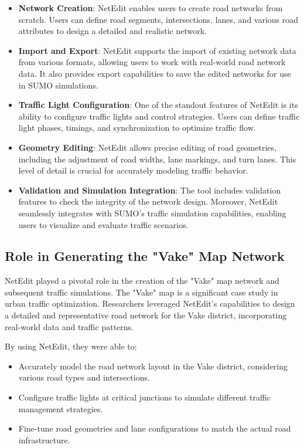 \begin{itemize}
    \item \textbf{Network Creation}: NetEdit enables users to create road networks from scratch. Users can define road segments, intersections, lanes, and various road attributes to design a detailed and realistic network.
    
    \item \textbf{Import and Export}: NetEdit supports the import of existing network data from various formats, allowing users to work with real-world road network data. It also provides export capabilities to save the edited networks for use in SUMO simulations.
    
    \item \textbf{Traffic Light Configuration}: One of the standout features of NetEdit is its ability to configure traffic lights and control strategies. Users can define traffic light phases, timings, and synchronization to optimize traffic flow.
    
    \item \textbf{Geometry Editing}: NetEdit allows precise editing of road geometries, including the adjustment of road widths, lane markings, and turn lanes. This level of detail is crucial for accurately modeling traffic behavior.
    
    \item \textbf{Validation and Simulation Integration}: The tool includes validation features to check the integrity of the network design. Moreover, NetEdit seamlessly integrates with SUMO's traffic simulation capabilities, enabling users to visualize and evaluate traffic scenarios.
\end{itemize}

\subsection{Role in Generating the "Vake" Map Network}

NetEdit played a pivotal role in the creation of the "Vake" map network and subsequent traffic simulations. The "Vake" map is a significant case study in urban traffic optimization. Researchers leveraged NetEdit's capabilities to design a detailed and representative road network for the Vake district, incorporating real-world data and traffic patterns.

By using NetEdit, they were able to:

\begin{itemize}
    \item Accurately model the road network layout in the Vake district, considering various road types and intersections.
    \item Configure traffic lights at critical junctions to simulate different traffic management strategies.
    \item Fine-tune road geometries and lane configurations to match the actual road infrastructure.
\end{itemize}

